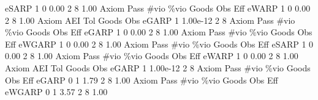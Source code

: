        eSARP {\VBAR}    1           0        0.00           2           8        1.00  
{\smallskip}
{\smallskip}
{\smallskip}
       Axiom {\VBAR} Pass        \#vio        \%vio       Goods         Obs         Eff  
       eWARP {\VBAR}    1           0        0.00           2           8        1.00  
{\smallskip}
       Axiom {\VBAR}       AEI        Tol      Goods        Obs 
       eGARP {\VBAR}         1   1.00e-12          2          8 
{\smallskip}
{\smallskip}
{\smallskip}
       Axiom {\VBAR} Pass        \#vio        \%vio       Goods         Obs         Eff  
       eGARP {\VBAR}    1           0        0.00           2           8        1.00  
{\smallskip}
{\smallskip}
{\smallskip}
       Axiom {\VBAR} Pass        \#vio        \%vio       Goods         Obs         Eff  
      eWGARP {\VBAR}    1           0        0.00           2           8        1.00  
{\smallskip}
{\smallskip}
{\smallskip}
       Axiom {\VBAR} Pass        \#vio        \%vio       Goods         Obs         Eff  
       eSARP {\VBAR}    1           0        0.00           2           8        1.00  
{\smallskip}
{\smallskip}
{\smallskip}
       Axiom {\VBAR} Pass        \#vio        \%vio       Goods         Obs         Eff  
       eWARP {\VBAR}    1           0        0.00           2           8        1.00  
{\smallskip}
       Axiom {\VBAR}       AEI        Tol      Goods        Obs 
       eGARP {\VBAR}         1   1.00e-12          2          8 
{\smallskip}
{\smallskip}
{\smallskip}
       Axiom {\VBAR} Pass        \#vio        \%vio       Goods         Obs         Eff  
       eGARP {\VBAR}    0           1        1.79           2           8        1.00  
{\smallskip}
{\smallskip}
{\smallskip}
       Axiom {\VBAR} Pass        \#vio        \%vio       Goods         Obs         Eff  
      eWGARP {\VBAR}    0           1        3.57           2           8        1.00  
{\smallskip}
{\smallskip}
{\smallskip}
